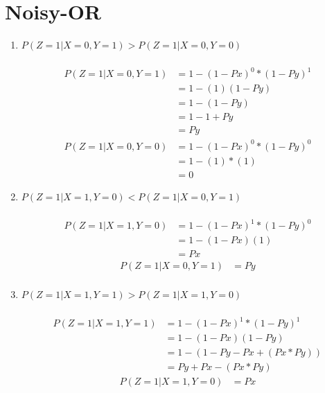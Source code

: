 \documentclass[]{article}
\begin{document}
\newpage
\section{Noisy-OR}

\begin{enumerate}
  \item $P(Z =1|X =0, Y =1) > P(Z =1|X =0, Y =0)$ \\
  \\
  \begin{align*}
    P(Z =1|X =0, Y =1) & = 1-(1-Px)^0*(1-Py)^1 \\
    &= 1-(1)(1-Py) \\
    &= 1-(1-Py) \\
    &= 1-1+Py \\
    &= Py
  \end{align*}
  \begin{align*}
    P(Z =1|X =0, Y =0) & = 1-(1-Px)^0*(1-Py)^0 \\
    &= 1-(1)*(1) \\
    &= 0
  \end{align*}

  \item $P(Z =1|X =1, Y =0) < P(Z =1|X =0, Y =1)$ \\
  \\
  \begin{align*}
    P(Z =1|X =1, Y =0) & = 1-(1-Px)^1*(1-Py)^0 \\
    &= 1-(1-Px)(1) \\
    &= Px
  \end{align*}
  \begin{align*}
    P(Z =1|X =0, Y =1) & = Py \\
  \end{align*}

  \item $P(Z =1|X =1, Y =1) > P(Z =1|X =1, Y =0)$ \\
  \\
  \begin{align*}
    P(Z =1|X =1, Y =1) & = 1-(1-Px)^1*(1-Py)^1 \\
    &= 1-(1-Px)(1-Py) \\
    &= 1-(1-Py-Px+(Px*Py)) \\
    &= Py+Px-(Px*Py)
  \end{align*}
  \begin{align*}
    P(Z =1|X =1, Y =0) & = Px \\
  \end{align*}
\end{enumerate}
\end{document}
